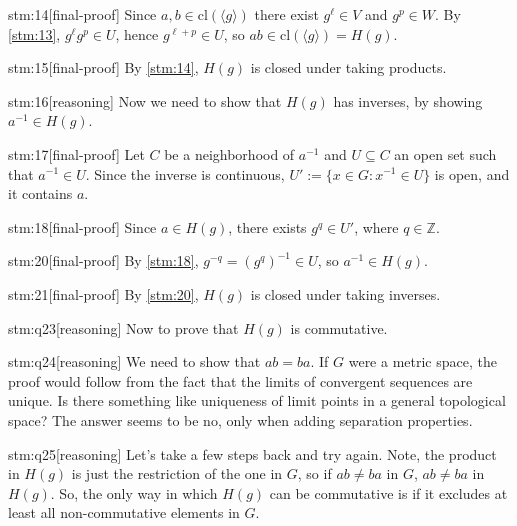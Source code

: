 \begin{stm}{stm:14}[final-proof]
Since $a,b \in \mathrm{cl}({\langle g \rangle})$ there exist $g^\ell \in V$ and $g^p \in W$. By \ref{stm:13}, $g^\ell g^p \in U$, hence $g^{\ell+p} \in U$, so $ab \in \mathrm{cl}({\langle g \rangle}) = H(g)$.
\end{stm}

\begin{stm}{stm:15}[final-proof]
By \ref{stm:14}, $H(g)$ is closed under taking products.
\end{stm}

\begin{stm}{stm:16}[reasoning]
Now we need to show that $H(g)$ has inverses, by showing $a^{-1} \in H(g)$.
\end{stm}

\begin{stm}{stm:17}[final-proof]
Let $C$ be a neighborhood of $a^{-1}$ and $U \subseteq C$ an open set such that $a^{-1} \in U$. Since the inverse is continuous, $U' := \{x \in G : x^{-1} \in U\}$ is open, and it contains $a$.
\end{stm}

\begin{stm}{stm:18}[final-proof]
Since $a \in H(g)$, there exists $g^q \in U'$, where $q \in \mathbb{Z}$.
\end{stm}

\begin{stm}{stm:20}[final-proof]
By \ref{stm:18}, $g^{-q} = (g^q)^{-1} \in U$, so $a^{-1} \in H(g)$.
\end{stm}

\begin{stm}{stm:21}[final-proof]
By \ref{stm:20}, $H(g)$ is closed under taking inverses.
\end{stm}

\begin{stm}{stm:q23}[reasoning]
Now to prove that $H(g)$ is commutative.
\end{stm}

\begin{stm}{stm:q24}[reasoning]
We need to show that $ab = ba$. If $G$ were a metric space, the proof would follow from the fact that the limits of convergent sequences are unique. Is there something like uniqueness of limit points in a general topological space? The answer seems to be no, only when adding separation properties.
\end{stm}

\begin{stm}{stm:q25}[reasoning]
Let’s take a few steps back and try again. Note, the product in $H(g)$ is just the restriction of the one in $G$, so if $ab \ne ba$ in $G$, $ab \ne ba$ in $H(g)$. So, the only way in which $H(g)$ can be commutative is if it excludes at least all non-commutative elements in $G$.
\end{stm}

